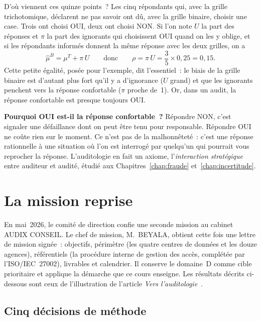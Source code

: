 D'où viennent ces quinze points~? Les cinq répondants qui, avec la grille
trichotomique, déclarent ne pas savoir ont dû, avec la grille binaire,
choisir une case. Trois ont choisi OUI, deux ont choisi NON. Si l'on note
$U$ la part des réponses \NEK{} et $\pi$ la part des ignorants qui
choisissent OUI quand on les y oblige, et si les répondants informés
donnent la même réponse avec les deux grilles, on a
\[
    \hat\mu^{B} = \mu^{T} + \pi\, U
    \qquad\text{donc}\qquad
    \rho = \pi\, U = \frac{3}{5} \times 0{,}25 = 0{,}15.
\]
Cette petite égalité, posée pour l'exemple, dit l'essentiel~: le biais de
la grille binaire est d'autant plus fort qu'il y a d'ignorance ($U$ grand)
et que les ignorants penchent vers la réponse confortable ($\pi$ proche
de~1). Or, dans un audit, la réponse confortable est presque toujours OUI.

\begin{boxinfo}
\textbf{Pourquoi OUI est-il la réponse confortable~?} Répondre NON, c'est
signaler une défaillance dont on peut être tenu pour responsable. Répondre
OUI ne coûte rien sur le moment. Ce n'est pas de la malhonnêteté~: c'est
une réponse rationnelle à une situation où l'on est interrogé par quelqu'un
qui pourrait vous reprocher la réponse. L'auditologie en fait un axiome,
l'\emph{interaction stratégique} entre auditeur et audité, étudié aux
Chapitres~\ref{chap:fraude} et~\ref{chap:incertitude}.
\end{boxinfo}

\section{La mission reprise}
\label{sec:pro-reprise}

En mai~2026, le comité de direction confie une seconde mission au cabinet
AUDIX CONSEIL. Le chef de mission, M.~BEYALA, obtient cette fois une lettre
de mission signée~: objectifs, périmètre (les quatre centres de données et
les douze agences), référentiels (la procédure interne de gestion des
accès, complétée par l'ISO/IEC~27002), livrables et calendrier. Il conserve
le domaine~D comme cible prioritaire et applique la démarche que ce cours
enseigne. Les résultats décrits ci-dessous sont ceux de l'illustration de
l'article \emph{Vers l'auditologie}~\cite{minka2026auditologie}.

\subsection{Cinq décisions de méthode}

